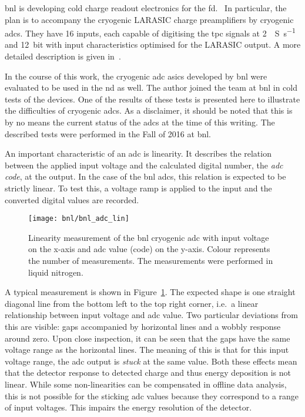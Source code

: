 \gls{bnl} is developing cold charge readout electronics for the \dune{} \gls{fd}.~\cite{protodune-sp}
In particular, the plan is to accompany the cryogenic LARASIC charge preamplifiers by cryogenic \glspl{adc}.
They have \num{16} inputs, each capable of digitising the \gls{tpc} signals at \SI{2}{\mega{}S\per\second} and \SI{12}{bit} with input characteristics optimised for the LARASIC output.
A more detailed description is given in~\cite{bnl_adc}.

In the course of this work, the cryogenic \gls{adc} \glspl{asic} developed by \gls{bnl} were evaluated to be used in the \gls{nd} as well.
The author joined the team at \gls{bnl} in cold tests of the devices.
One of the results of these tests is presented here to illustrate the difficulties of cryogenic \glspl{adc}.
As a disclaimer, it should be noted that this is by no means the current status of the \glspl{adc} at the time of this writing.
The described tests were performed in the Fall of 2016 at \gls{bnl}.

An important characteristic of an \gls{adc} is linearity.
It describes the relation between the applied input voltage and the calculated digital number, the \emph{\gls{adc} code}, at the output.
In the case of the \gls{bnl} \glspl{adc}, this relation is expected to be strictly linear.
To test this, a voltage ramp is applied to the input and the converted digital values are recorded.

\begin{figure}[htb]
	\centering
	\texttt{[image: bnl/bnl\_adc\_lin]}
	\caption[Linearity measurement of  cryogenic  ]{%
		Linearity measurement of the \acrshort{bnl} cryogenic \acrshort{adc}  with input voltage on the x-axis and \acrshort{adc} value (code) on the y-axis.
		Colour represents the number of measurements.
		The measurements were performed in liquid nitrogen.
	}
	\label{fig:bnl_adc_lin}
\end{figure}

A typical measurement is shown in Figure~\ref{fig:bnl_adc_lin}.
The expected shape is one straight diagonal line from the bottom left to the top right corner, i.e.\ a linear relationship between input voltage and \gls{adc} value.
Two particular deviations from this are visible: gaps accompanied by horizontal lines and a wobbly response around zero.
Upon close inspection, it can be seen that the gaps have the same voltage range as the horizontal lines.
The meaning of this is that for this input voltage range, the \gls{adc} output is \emph{stuck} at the same value.
Both these effects mean that the detector response to detected charge and thus energy deposition is not linear.
While some non-linearities can be compensated in offline data analysis, this is not possible for the sticking \gls{adc} values because they correspond to a range of input voltages.
This impairs the energy resolution of the detector.

